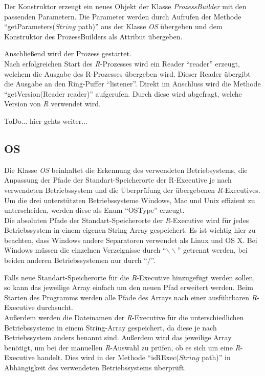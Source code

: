 \documentclass[a4paper, 12pt]{report} %
\begin{document}
Der Konstruktor erzeugt ein neues Objekt der Klasse \textit{ProzessBuilder} mit den passenden Parametern. Die Parameter werden durch Aufrufen der Methode "`getParameters($String$ path)"' aus der Klasse \textit{OS} übergeben und dem Konstruktor des ProzessBuilders als Attribut übergeben.

Anschließend wird der Prozess gestartet.\\

Nach erfolgreichen Start des \textit{R}-Prozesses wird ein Reader "`reader"' erzeugt, welchem die Ausgabe des R-Prozesses übergeben wird. Dieser Reader übergibt die Ausgabe an den Ring-Puffer "`listener"'.
Direkt im Anschluss wird die Methode "`getVersion(Reader reader)"' aufgerufen. Durch diese wird abgefragt, welche Version von \textit{R} verwendet wird.
 
ToDo... hier gehts weiter...


\subsection{OS} \label{OS}

Die Klasse \textit{OS} beinhaltet die Erkennung des verwendeten Betriebsystems, die Anpassung der Pfade der Standart-Speicherorte der R-Executive je nach verwendeten Betriebssystem und die Überprüfung der übergebenen \textit{R}-Executives.\\

Um die drei unterstützten Betriebssysteme Windows, Mac und Unix effizient zu unterscheiden, werden diese als Enum "`OSType"' erzeugt.\\

Die absoluten Pfade der Standart-Speicherorte der \textit{R}-Executive wird für jedes Betriebssystem in einem eigenen String Array gespeichert. Es ist wichtig hier zu beachten, dass Windows andere Separatoren verwendet als Linux und OS X.
Bei Windows müssen die einzelnen Verzeignisse durch "`$\backslash \backslash$"' getrennt werden, bei beiden anderen Betriebssystemen nur durch "`/"'. 

Falls neue Standart-Speicherorte für die \textit{R}-Executive hinzugefügt werden sollen, so kann das jeweilige Array einfach um den neuen Pfad erweitert werden. Beim Starten des Programms werden alle Pfade des Arrays nach einer ausführbaren \textit{R}-Executive durchsucht.\\

Außerdem werden die Dateinamen der \textit{R}-Executive für die unterschiedlichen Betriebssysteme in einem String-Array gespeichert, da diese je nach Betriebssystem anders benannt sind. Außerdem wird das jeweilige Array benötigt, um bei der manuellen \textit{R}-Auswahl zu prüfen, ob es sich um eine \textit{R}-Executive handelt. Dies wird in der Methode "`isRExec($String$ path)"' in Abhängigkeit des verwendeten Betriebssystems überprüft.\\
\end{document}
